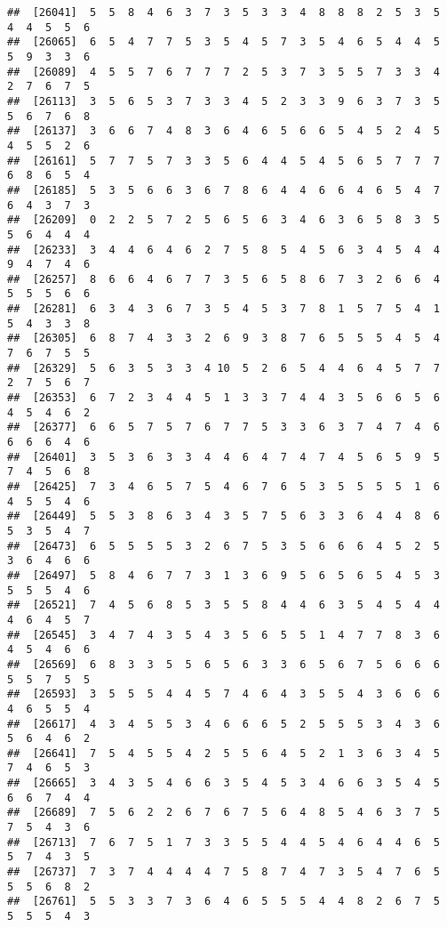 \documentclass[
]{book}
\begin{document}
\begin{verbatim}
##  [26041]  5  5  8  4  6  3  7  3  5  3  3  4  8  8  8  2  5  3  5  4  4  5  5  6
##  [26065]  6  5  4  7  7  5  3  5  4  5  7  3  5  4  6  5  4  4  5  5  9  3  3  6
##  [26089]  4  5  5  7  6  7  7  7  2  5  3  7  3  5  5  7  3  3  4  2  7  6  7  5
##  [26113]  3  5  6  5  3  7  3  3  4  5  2  3  3  9  6  3  7  3  5  5  6  7  6  8
##  [26137]  3  6  6  7  4  8  3  6  4  6  5  6  6  5  4  5  2  4  5  4  5  5  2  6
##  [26161]  5  7  7  5  7  3  3  5  6  4  4  5  4  5  6  5  7  7  7  6  8  6  5  4
##  [26185]  5  3  5  6  6  3  6  7  8  6  4  4  6  6  4  6  5  4  7  6  4  3  7  3
##  [26209]  0  2  2  5  7  2  5  6  5  6  3  4  6  3  6  5  8  3  5  5  6  4  4  4
##  [26233]  3  4  4  6  4  6  2  7  5  8  5  4  5  6  3  4  5  4  4  9  4  7  4  6
##  [26257]  8  6  6  4  6  7  7  3  5  6  5  8  6  7  3  2  6  6  4  5  5  5  6  6
##  [26281]  6  3  4  3  6  7  3  5  4  5  3  7  8  1  5  7  5  4  1  5  4  3  3  8
##  [26305]  6  8  7  4  3  3  2  6  9  3  8  7  6  5  5  5  4  5  4  7  6  7  5  5
##  [26329]  5  6  3  5  3  3  4 10  5  2  6  5  4  4  6  4  5  7  7  2  7  5  6  7
##  [26353]  6  7  2  3  4  4  5  1  3  3  7  4  4  3  5  6  6  5  6  4  5  4  6  2
##  [26377]  6  6  5  7  5  7  6  7  7  5  3  3  6  3  7  4  7  4  6  6  6  6  4  6
##  [26401]  3  5  3  6  3  3  4  4  6  4  7  4  7  4  5  6  5  9  5  7  4  5  6  8
##  [26425]  7  3  4  6  5  7  5  4  6  7  6  5  3  5  5  5  5  1  6  4  5  5  4  6
##  [26449]  5  5  3  8  6  3  4  3  5  7  5  6  3  3  6  4  4  8  6  5  3  5  4  7
##  [26473]  6  5  5  5  5  3  2  6  7  5  3  5  6  6  6  4  5  2  5  3  6  4  6  6
##  [26497]  5  8  4  6  7  7  3  1  3  6  9  5  6  5  6  5  4  5  3  5  5  5  4  6
##  [26521]  7  4  5  6  8  5  3  5  5  8  4  4  6  3  5  4  5  4  4  4  6  4  5  7
##  [26545]  3  4  7  4  3  5  4  3  5  6  5  5  1  4  7  7  8  3  6  4  5  4  6  6
##  [26569]  6  8  3  3  5  5  6  5  6  3  3  6  5  6  7  5  6  6  6  5  5  7  5  5
##  [26593]  3  5  5  5  4  4  5  7  4  6  4  3  5  5  4  3  6  6  6  4  6  5  5  4
##  [26617]  4  3  4  5  5  3  4  6  6  6  5  2  5  5  5  3  4  3  6  5  6  4  6  2
##  [26641]  7  5  4  5  5  4  2  5  5  6  4  5  2  1  3  6  3  4  5  7  4  6  5  3
##  [26665]  3  4  3  5  4  6  6  3  5  4  5  3  4  6  6  3  5  4  5  6  6  7  4  4
##  [26689]  7  5  6  2  2  6  7  6  7  5  6  4  8  5  4  6  3  7  5  7  5  4  3  6
##  [26713]  7  6  7  5  1  7  3  3  5  5  4  4  5  4  6  4  4  6  5  5  7  4  3  5
##  [26737]  7  3  7  4  4  4  4  7  5  8  7  4  7  3  5  4  7  6  5  5  5  6  8  2
##  [26761]  5  5  3  3  7  3  6  4  6  5  5  5  4  4  8  2  6  7  5  5  5  5  4  3

\end{verbatim}
\end{document}
